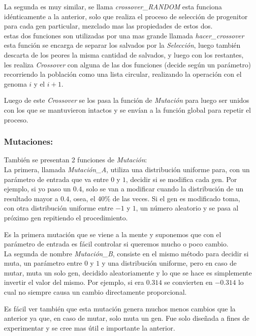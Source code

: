 La segunda es muy similar, se llama \emph{crossover\_RANDOM} esta funciona idénticamente a la anterior, solo que realiza el proceso
de selección de progenitor para cada gen particular, mezclado mas las propiedades de estos dos.\\

estas dos funciones son utilizadas por una mas grande llamada \emph{hacer\_crossover} esta función se encarga de separar los salvados
por la \emph{Selección}, luego también descarta de los peores la misma cantidad de salvados, y luego con los restantes, les realiza
\emph{Crossover} con alguna de las dos funciones (decide según un parámetro) recorriendo la población como una lista circular,
realizando la operación con el genoma $i$ y el $i+1$.

Luego de este \emph{Crossover} se los pasa la función de \emph{Mutación} para luego ser unidos con los que se mantuvieron
intactos y se envían a la función global para repetir el proceso.


\subsubsection{Mutaciones:}

También se presentan 2 funciones de \emph{Mutación}:\\

La primera, llamada \emph{Mutación\_A}, utiliza una distribución uniforme para, con un parámetro de entrada que va entre $0$ y $1$,
decidir si se modifica cada gen. Por ejemplo, si yo paso un $0.4$, solo se van a modificar cuando
la distribución de un resultado mayor a $0.4$, osea, el $40\%$ de las veces. Si el gen es modificado toma,
con otra distribución uniforme entre $-1$ y $1$, un número aleatorio y se pasa al próximo gen repitiendo
el procedimiento.


Es la primera mutación que se viene a la mente y suponemos que con el parámetro de entrada es fácil controlar si queremos
mucho o poco cambio.\\

La segunda de nombre \emph{Mutación\_B}, consiste en el mismo método para decidir si muta, un parámetro entre $0$ y $1$
y una distribución uniforme, pero en caso de mutar, muta un solo gen, decidido aleatoriamente y lo que se hace es simplemente
invertir el valor del mismo. Por ejemplo, si era $0.314$ se convierten en $-0.314$ lo cual no siempre causa un cambio
directamente proporcional.

Es fácil ver también que esta mutación genera muchos menos cambios que la anterior ya que, en caso de mutar, solo muta un gen.
Fue solo diseñada a fines de experimentar y se cree mas útil e importante la anterior.
\\


